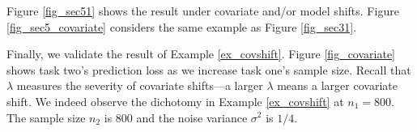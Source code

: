 Figure \ref{fig_sec51} shows the result under covariate and/or model shifts.
Figure \ref{fig_sec5_covariate} considers the same example as Figure \ref{fig_sec31}.
    


Finally, we validate the result of Example \ref{ex_covshift}.
Figure \ref{fig_covariate} shows task two's prediction loss as we increase task one's sample size.
Recall that $\lambda$ measures the severity of covariate shifts---a larger $\lambda$ means a larger covariate shift.
We indeed observe the dichotomy in Example \ref{ex_covshift} at $n_1 = 800$.
The sample size $n_2$ is $800$ and the noise variance $\sigma^2$ is $1/4$.

